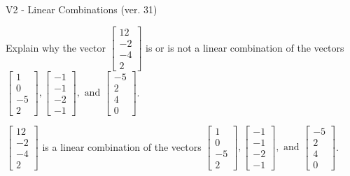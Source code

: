 \begin{exercise}
  \begin{exerciseTitle}V2 - Linear Combinations (ver. 31)\end{exerciseTitle}
  \begin{exerciseStatement}
    Explain why the vector \(\left[\begin{array}{c}
12 \\
-2 \\
-4 \\
2
\end{array}\right]\)  is or is not a linear 
	combination of the vectors \(\left[\begin{array}{c}
1 \\
0 \\
-5 \\
2
\end{array}\right] , \left[\begin{array}{c}
-1 \\
-1 \\
-2 \\
-1
\end{array}\right] , \text{ and } \left[\begin{array}{c}
-5 \\
2 \\
4 \\
0
\end{array}\right]\).
	


  \end{exerciseStatement}
  \begin{exerciseAnswer}
   \(\left[\begin{array}{c}
12 \\
-2 \\
-4 \\
2
\end{array}\right]\) 
  	 is  
	a linear combination of the vectors \(\left[\begin{array}{c}
1 \\
0 \\
-5 \\
2
\end{array}\right] , \left[\begin{array}{c}
-1 \\
-1 \\
-2 \\
-1
\end{array}\right] , \text{ and } \left[\begin{array}{c}
-5 \\
2 \\
4 \\
0
\end{array}\right]\).

	
  


  \end{exerciseAnswer}
\end{exercise}